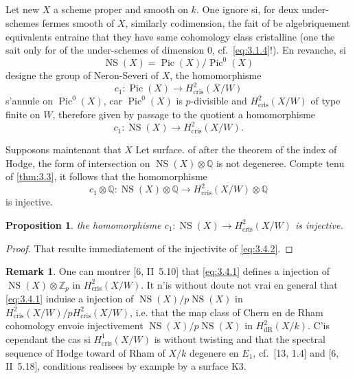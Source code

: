 \documentclass[12pt,a4paper]{article}
\theoremstyle{plain}
\newtheorem{proposition}[theorem]{Proposition}
\theoremstyle{definition}
\newtheorem{remark}[theorem]{Remark}
\theoremstyle{remark}
\DeclareMathOperator{\Pic}{Pic}
\DeclareMathOperator{\NS}{NS}
\newcommand{\cris}{\mathrm{cris}}
\begin{document}
\subsection{}

Let new $X$ a scheme proper and smooth on $k$. One ignore si, for deux under-schemes fermes smooth of $X$, similarly codimension, the fait of be algebriquement equivalents entraine that they have same cohomology class cristalline (one the sait only for of the under-schemes of dimension $0$, cf.~\eqref{eq:3.1.4}!). En revanche, si
\[
\NS(X) = \Pic(X)/\Pic^0(X)
\]
designe the group of Neron-Severi of $X$, the homomorphisme
\[
c_1: \Pic(X) \to H^2_{\cris}(X/W)
\]
s'annule on $\Pic^0(X)$, car $\Pic^0(X)$ is $p$-divisible and $H^2_{\cris}(X/W)$ of type finite on $W$, therefore given by passage to the quotient a homomorphisme
\begin{equation}\label{eq:3.4.1}
c_1: \NS(X) \to H^2_{\cris}(X/W).
\end{equation}

Supposons maintenant that $X$ Let surface. of after the theorem of the index of Hodge, the form of intersection on $\NS(X) \otimes \mathbb{Q}$ is not degeneree. Compte tenu of \ref{thm:3.3}, it follows that the homomorphisme
\begin{equation}\label{eq:3.4.2}
c_1 \otimes \mathbb{Q}: \NS(X) \otimes \mathbb{Q} \to H^2_{\cris}(X/W) \otimes \mathbb{Q}
\end{equation}
is injective.

\begin{proposition}\label{prop:3.4}
the homomorphisme $c_1: \NS(X) \to H^2_{\cris}(X/W)$ is injective.
\end{proposition}

\begin{proof}
That resulte immediatement of the injectivite of \eqref{eq:3.4.2}.
\end{proof}

\begin{remark}\label{rem:3.5}
One can montrer [6, II~5.10] that \eqref{eq:3.4.1} defines a injection of $\NS(X) \otimes \mathbb{Z}_p$ in $H^2_{\cris}(X/W)$. It n'is without doute not vrai en general that \eqref{eq:3.4.1} induise a injection of $\NS(X)/p\NS(X)$ in $H^2_{\cris}(X/W)/pH^2_{\cris}(X/W)$, i.e. that the map class of Chern en de Rham cohomology envoie injectivement $\NS(X)/p\NS(X)$ in $H^2_{\mathrm{dR}}(X/k)$. C'is cependant the cas si $H^1_{\cris}(X/W)$ is without twisting and that the spectral sequence of Hodge toward of Rham of $X/k$ degenere en $E_1$, cf.~[13, 1.4] and [6, II~5.18], conditions realisees by example by a surface K3.
\end{remark}
\end{document}
